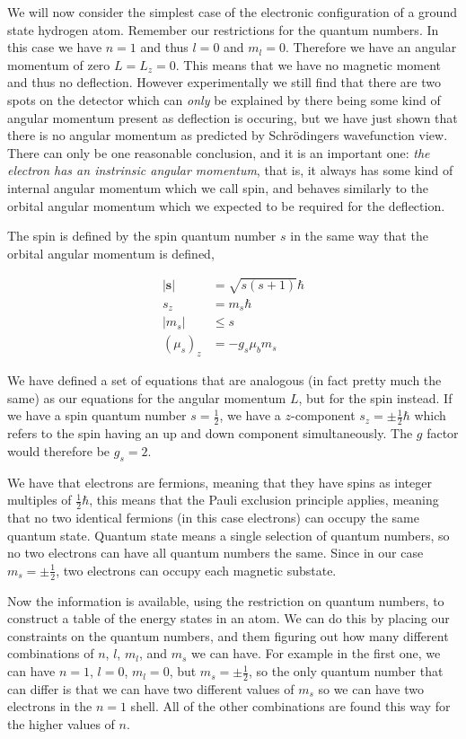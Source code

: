 \documentclass[11pt]{amsart}
\begin{document}
We will now consider the simplest case of the electronic configuration of a ground state hydrogen atom. Remember our restrictions for the quantum numbers. In this case we have $n = 1$ and thus $l = 0$ and $m_l = 0$. Therefore we have an angular momentum of zero $L = L_z = 0$. This means that we have no magnetic moment and thus no deflection. However experimentally we still find that there are two spots on the detector which can \textit{only} be explained by there being some kind of angular momentum present as deflection is occuring, but we have just shown that there is no angular momentum as predicted by Schr\"{o}dingers wavefunction view. There can only be one reasonable conclusion, and it is an important one: \textit{the electron has an instrinsic angular momentum}, that is, it always has some kind of internal angular momentum which we call spin, and behaves similarly to the orbital angular momentum which we expected to be required for the deflection.

The spin is defined by the spin quantum number $s$ in the same way that the orbital angular momentum is defined,

\begin{align*}
  |\mathbf{s}| &= \sqrt{s(s+1)}\hbar \\
  s_z &= m_s \hbar \\
  |m_s| &\leq s \\
  {(\mu_s)}_z &= -g_s \mu_b m_s
\end{align*}

We have defined a set of equations that are analogous (in fact pretty much the same) as our equations for the angular momentum $L$, but for the spin instead. If we have a spin quantum number $s = \frac{1}{2}$, we have a $z$-component $s_z = \pm \frac{1}{2}\hbar$ which refers to the spin having an up and down component simultaneously. The $g$ factor would therefore be $g_s = 2$.

We have that electrons are fermions, meaning that they have spins as integer multiples of $\frac{1}{2}\hbar$, this means that the Pauli exclusion principle applies, meaning that no two identical fermions (in this case electrons) can occupy the same quantum state. Quantum state means a single selection of quantum numbers, so no two electrons can have all quantum numbers the same. Since in our case $m_s = \pm \frac{1}{2}$, two electrons can occupy each magnetic substate.

Now the information is available, using the restriction on quantum numbers, to construct a table of the energy states in an atom. We can do this by placing our constraints on the quantum numbers, and them figuring out how many different combinations of $n$, $l$, $m_l$, and $m_s$ we can have. For example in the first one, we can have $n = 1$, $l = 0$, $m_l = 0$, but $m_s = \pm \frac{1}{2}$, so the only quantum number that can differ is that we can have two different values of $m_s$ so we can have two electrons in the $n = 1$ shell. All of the other combinations are found this way for the higher values of $n$.
\end{document}
